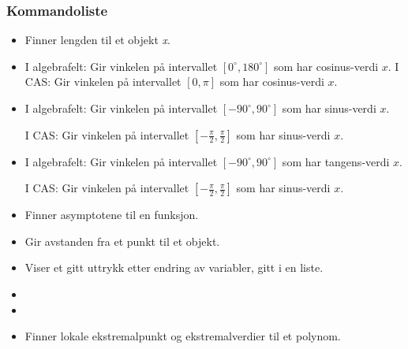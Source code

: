 \subsubsection{Kommandoliste}
\begin{itemize}
\item {}
{Finner lengden til et objekt \textit{x}.
}

\item {}
{
I algebrafelt: Gir vinkelen på intervallet $ [0^\circ, 180^\circ] $ som har cosinus-verdi $ x $. \os
I CAS: Gir vinkelen på intervallet $ [0, \pi] $ som har cosinus-verdi $ x $.
}

\item {}
{
I algebrafelt: Gir vinkelen på intervallet $ [-90^\circ, 90^\circ] $ som har sinus-verdi $ x $.\os

I CAS: Gir vinkelen på intervallet $ [-\frac{\pi}{2}, \frac{\pi}{2}] $ som har sinus-verdi $ x $.
}

\item {}
{
I algebrafelt: Gir vinkelen på intervallet $ [-90^\circ, 90^\circ] $ som har tangens-verdi $ x $.\os

I CAS: Gir vinkelen på intervallet $ [-\frac{\pi}{2}, \frac{\pi}{2}] $ som har sinus-verdi $ x $.
}

\item {}
{Finner asymptotene til en funksjon.}



\item {}
{Gir avstanden fra et punkt til et objekt.}

\item {}
{Viser et gitt uttrykk etter endring av variabler, gitt i en liste.}

\item {}

\item {}

\item {}
{Finner lokale ekstremalpunkt og ekstremalverdier til et polynom.}


\end{itemize}
